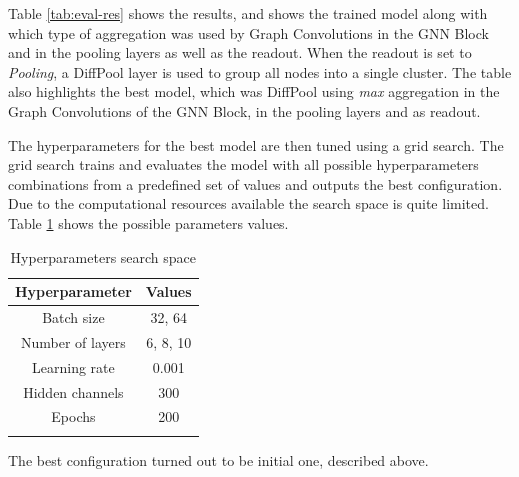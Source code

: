 \documentclass[journal]{IEEEtran}
\begin{document}
Table \ref{tab:eval-res} shows the results, and shows the trained model along with which type of aggregation was used by Graph Convolutions in the GNN Block and in the pooling layers as well as the readout. When the readout is set to \textit{Pooling}, a DiffPool layer is used to group all nodes into a single cluster.
The table also highlights the best model, which was DiffPool using \textit{max} aggregation in the Graph Convolutions of the GNN Block, in the pooling layers and as readout.

The hyperparameters for the best model are then tuned using a grid search.
The grid search trains and evaluates the model with all possible hyperparameters combinations from a predefined set of values and outputs the best configuration.
Due to the computational resources available the search space is quite limited. Table \ref{tab:hyper-search-space} shows the possible parameters values.

\begin{table}[ht]
\centering
\begin{tabular}{@{}cc@{}}
\toprule
\textbf{Hyperparameter} & \textbf{Values} \\ \midrule
Batch size              & 32, 64          \\
Number of layers        & 6, 8, 10        \\
Learning rate           & 0.001           \\
Hidden channels         & 300             \\
Epochs                  & 200             \\ \bottomrule\\
\end{tabular}
\caption{Hyperparameters search space}
\label{tab:hyper-search-space}
\end{table}

\noindent The best configuration turned out to be initial one, described above.
\end{document}
